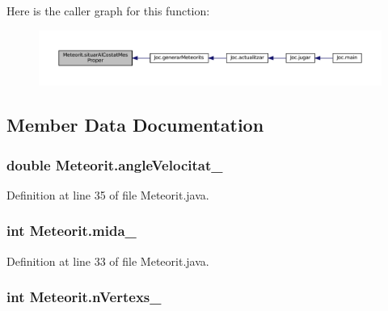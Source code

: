 Here is the caller graph for this function\+:\nopagebreak
\begin{figure}[H]
\begin{center}
\leavevmode
\includegraphics[width=350pt]{class_meteorit_ab1e8e957f4ba216253d211523f2b3091_icgraph}
\end{center}
\end{figure}




\subsection{Member Data Documentation}
\hypertarget{class_meteorit_aac671cdd1a62add36c52e0bbacea02a7}{}
\subsubsection[{angle\+Velocitat\+\_\+}]{\setlength{\rightskip}{0pt plus 5cm}double Meteorit.\+angle\+Velocitat\+\_\+\hspace{0.3cm}{\ttfamily [private]}}\label{class_meteorit_aac671cdd1a62add36c52e0bbacea02a7}


Definition at line 35 of file Meteorit.\+java.

\hypertarget{class_meteorit_a7041d52c0df04f993a84cddfc80718c8}{}
\subsubsection[{mida\+\_\+}]{\setlength{\rightskip}{0pt plus 5cm}int Meteorit.\+mida\+\_\+\hspace{0.3cm}{\ttfamily [private]}}\label{class_meteorit_a7041d52c0df04f993a84cddfc80718c8}


Definition at line 33 of file Meteorit.\+java.

\hypertarget{class_meteorit_a06345b40c0fb7045c79252b686040295}{}
\subsubsection[{n\+Vertexs\+\_\+}]{\setlength{\rightskip}{0pt plus 5cm}int Meteorit.\+n\+Vertexs\+\_\+\hspace{0.3cm}{\ttfamily [private]}}\label{class_meteorit_a06345b40c0fb7045c79252b686040295}



